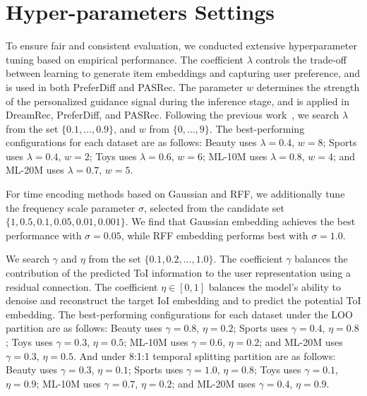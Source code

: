 \documentclass[sigconf,nonacm]{acmart}
\newcommand{\modelname}{PASRec}
\begin{document}
\section{Hyper-parameters Settings}
\label{app:hp}
To ensure fair and consistent evaluation, we conducted extensive hyperparameter tuning based on empirical performance. The coefficient \( \lambda \) controls the trade-off between learning to generate item embeddings and capturing user preference, and is used in both PreferDiff and \modelname. The parameter \( w \) determines the strength of the personalized guidance signal during the inference stage, and is applied in DreamRec, PreferDiff, and \modelname. Following the previous work~\cite{liu2024preference}, we search \( \lambda \) from the set \( \{0.1, \dots, 0.9\} \), and \( w \) from \( \{0,\dots,9\} \). The best-performing configurations for each dataset are as follows: Beauty uses \( \lambda = 0.4 \), \( w = 8 \); Sports uses \( \lambda = 0.4 \), \( w = 2 \); Toys uses \( \lambda = 0.6 \), \( w = 6 \); ML-10M uses \( \lambda = 0.8 \), \( w = 4 \); and ML-20M uses \( \lambda = 0.7 \), \( w = 5 \).

For time encoding methods based on Gaussian and RFF, we additionally tune the frequency scale parameter \( \sigma \), selected from the candidate set \( \{1, 0.5, 0.1, 0.05, 0.01, 0.001\} \). We find that Gaussian embedding achieves the best performance with \( \sigma = 0.05 \), while RFF embedding performs best with \( \sigma = 1.0 \).

We search \( \gamma \) and \( \eta \) from the set \( \{0.1, 0.2, \dots, 1.0\} \). The coefficient \( \gamma \) balances the contribution of the predicted ToI information to the user representation using a residual connection. The coefficient \( \eta \in [0,1] \) balances the model's ability to denoise and reconstruct the target IoI embedding and to predict the potential ToI embedding. The best-performing configurations for each dataset under the LOO partition are as follows: Beauty uses \( \gamma = 0.8 \), \( \eta = 0.2 \); Sports uses \( \gamma = 0.4 \), \( \eta = 0.8 \); Toys uses \( \gamma = 0.3 \), \( \eta = 0.5 \); ML-10M uses \( \gamma = 0.6 \), \( \eta = 0.2 \); and ML-20M uses \( \gamma = 0.3 \), \( \eta = 0.5 \). And under 8:1:1 temporal splitting partition are as follows: Beauty uses \( \gamma = 0.3 \), \( \eta = 0.1 \); Sports uses \( \gamma = 1.0 \), \( \eta = 0.8 \); Toys uses \( \gamma = 0.1 \), \( \eta = 0.9 \); ML-10M uses \( \gamma = 0.7 \), \( \eta = 0.2 \); and ML-20M uses \( \gamma = 0.4 \), \( \eta = 0.9 \).
\end{document}
